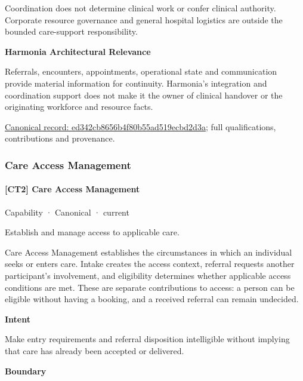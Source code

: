 Coordination does not determine clinical work or confer clinical authority. Corporate resource governance and general hospital logistics are outside the bounded care-support responsibility.



\textbf{Harmonia Architectural Relevance}



Referrals, encounters, appointments, operational state and communication provide material information for continuity. Harmonia's integration and coordination support does not make it the owner of clinical handover or the originating workforce and resource facts.


{\footnotesize \href{../../../../continuum/strategy/capability/ed342cb8656b4f80b55ad519ecbd2d3a.md}{Canonical record: ed342cb8656b4f80b55ad519ecbd2d3a}; full qualifications, contributions and provenance.}\par
\subsubsection{Care Access Management}

\paragraph{[CT2] Care Access Management}

\label{element:acbcad8330e64b59be5e3ec4a100a544}
{\small Capability · Canonical · current}\par

Establish and manage access to applicable care.



Care Access Management establishes the circumstances in which an individual seeks or enters care. Intake creates the access context, referral requests another participant's involvement, and eligibility determines whether applicable access conditions are met. These are separate contributions to access: a person can be eligible without having a booking, and a received referral can remain undecided.



\textbf{Intent}



Make entry requirements and referral disposition intelligible without implying that care has already been accepted or delivered.



\textbf{Boundary}




